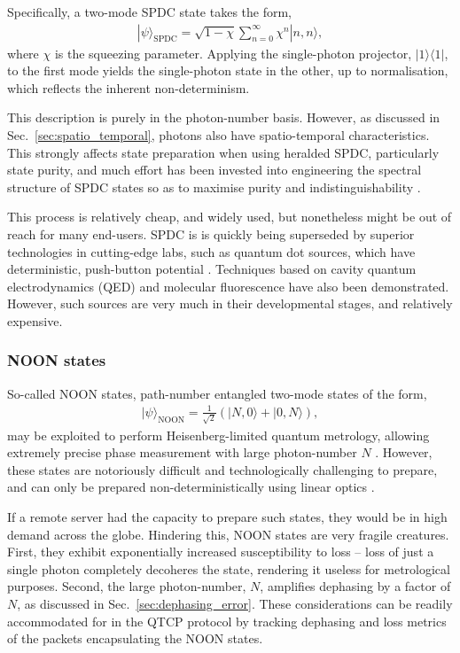 \documentclass[aps,rmp,twocolumn,amsmath,amssymb,nofootinbib,superscriptaddress,longbibliography,floatfix]{revtex4-1}
\newcommand{\bra}[1]{\langle#1|}
\newcommand{\ket}[1]{|#1\rangle}
\begin{document}
Specifically, a two-mode SPDC state takes the form,
\begin{align}
\ket\psi_\mathrm{SPDC} = \sqrt{1-\chi} \sum_{n=0}^\infty \chi^n \ket{n,n},
\end{align}
where $\chi$ is the squeezing parameter. Applying the single-photon projector, \mbox{$\ket{1}\bra{1}$}, to the first mode yields the single-photon state in the other, up to normalisation, which reflects the inherent non-determinism.

This description is purely in the photon-number basis. However, as discussed in Sec.~\ref{sec:spatio_temporal}, photons also have spatio-temporal characteristics. This strongly affects state preparation when using heralded SPDC, particularly state purity, and much effort has been invested into engineering the spectral structure of SPDC states so as to maximise purity and indistinguishability \cite{bib:Aichele02, more???}.

This process is relatively cheap, and widely used, but nonetheless might be out of reach for many end-users. SPDC is is quickly being superseded by superior technologies in cutting-edge labs, such as quantum dot sources, which have deterministic, push-button potential \cite{bib:Santori01, bib:Kiraz04}. Techniques based on cavity quantum electrodynamics (QED) \cite{bib:Brattke01} and molecular fluorescence \cite{bib:Brunel99} have also been demonstrated. However, such sources are very much in their developmental stages, and relatively expensive.

%
%

\subsubsection{NOON states} \label{sec:NOON}

So-called NOON states, path-number entangled two-mode states of the form,
\begin{align}
\ket\psi_\mathrm{NOON} = \frac{1}{\sqrt{2}}(\ket{N,0}+\ket{0,N}),
\end{align}
may be exploited to perform Heisenberg-limited quantum metrology, allowing extremely precise phase measurement with large photon-number $N$ \cite{bib:Dowling08}. However, these states are notoriously difficult and technologically challenging to prepare, and can only be prepared non-deterministically using linear optics \cite{bib:Cable07}.

If a remote server had the capacity to prepare such states, they would be in high demand across the globe. Hindering this, NOON states are very fragile creatures. First, they exhibit exponentially increased susceptibility to loss -- loss of just a single photon completely decoheres the state, rendering it useless for metrological purposes. Second, the large photon-number, $N$, amplifies dephasing by a factor of $N$, as discussed in Sec.~\ref{sec:dephasing_error}. These considerations can be readily accommodated for in the QTCP protocol by tracking dephasing and loss metrics of the packets encapsulating the NOON states.
\end{document}
